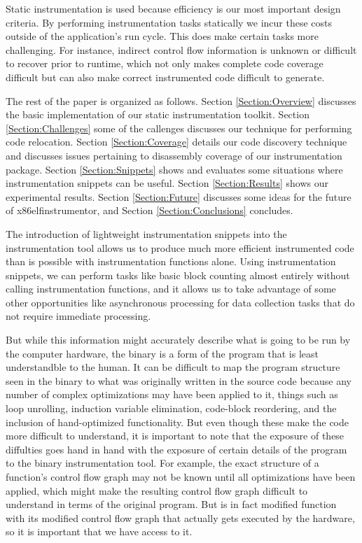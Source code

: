 

Static instrumentation is used because efficiency is our most important design 
criteria. By performing instrumentation tasks statically we incur these costs 
outside of the application's run cycle. This does make
certain tasks more challenging. For instance, indirect control flow information is unknown or
difficult to recover prior to runtime, which not only makes complete code
coverage difficult but can also make correct instrumented code difficult to
generate.

The rest of the paper is organized as follows. Section
\ref{Section:Overview} discusses the basic implementation of our static
instrumentation toolkit. Section \ref{Section:Challenges} some of the callenges discusses our
technique for performing code relocation. Section \ref{Section:Coverage} details
our code discovery technique and discusses issues pertaining to disassembly coverage of
our instrumentation package. Section \ref{Section:Snippets} shows and evaluates
some situations where instrumentation snippets can be useful. Section
\ref{Section:Results} shows our experimental results. Section
\ref{Section:Future} discusses some ideas for the future of x86elfinstrumentor,
and Section \ref{Section:Conclusions} concludes.

The introduction of lightweight instrumentation snippets into the
instrumentation tool allows us to produce much more
efficient instrumented code than is possible with instrumentation functions
alone. Using instrumentation snippets, we can perform tasks like basic block
counting almost entirely without calling instrumentation functions, and it
allows us to take advantage of some other opportunities like asynchronous
processing \cite{gao2005aliter} for data collection tasks that do not require
immediate processing.



But while this information might accurately describe what is going to be run by the computer hardware, the
binary is a form of the program that is least understandble to the human. It can be difficult to map the
program structure seen in the binary to what was originally written in the source code because any number of
complex optimizations may have been applied to it, things such as loop unrolling, induction variable 
elimination, code-block reordering, and the inclusion of hand-optimized functionality. But even though these
make the code more difficult to understand, it is important to note that the exposure of these diffulties
goes hand in hand with the exposure of certain details of the program to the binary instrumentation tool. For example, the exact structure
of a function's control flow graph may not be known until all optimizations have been applied, which might
make the resulting control flow graph difficult to understand in terms of the original program. But is in fact
modified function with its modified control flow graph that actually gets executed by the hardware, so it is
important that we have access to it.


